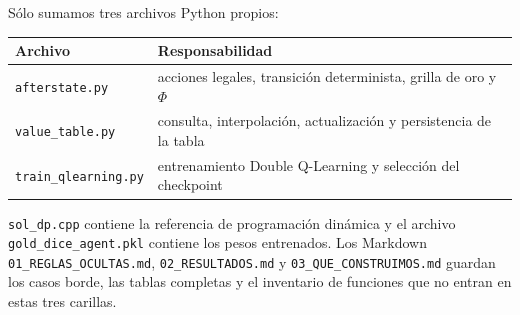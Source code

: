 \documentclass[10pt,a4paper]{article}
\begin{document}
Sólo sumamos tres archivos Python propios:

\begin{center}
\small
\begin{tabularx}{\textwidth}{@{}lX@{}}
\toprule
Archivo & Responsabilidad \\
\midrule
\texttt{afterstate.py} & acciones legales, transición determinista, grilla de oro y $\Phi$ \\
\texttt{value\_table.py} & consulta, interpolación, actualización y persistencia de la tabla \\
\texttt{train\_qlearning.py} & entrenamiento Double Q-Learning y selección del checkpoint \\
\bottomrule
\end{tabularx}
\end{center}

\texttt{sol\_dp.cpp} contiene la referencia de programación dinámica y el archivo \texttt{gold\_dice\_agent.pkl} contiene los pesos entrenados. Los Markdown \texttt{01\_REGLAS\_OCULTAS.md}, \texttt{02\_RESULTADOS.md} y \texttt{03\_QUE\_CONSTRUIMOS.md} guardan los casos borde, las tablas completas y el inventario de funciones que no entran en estas tres carillas.
\end{document}
